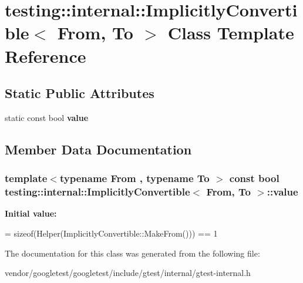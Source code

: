 \hypertarget{classtesting_1_1internal_1_1ImplicitlyConvertible}{}\section{testing\+:\+:internal\+:\+:Implicitly\+Convertible$<$ From, To $>$ Class Template Reference}
\label{classtesting_1_1internal_1_1ImplicitlyConvertible}
\subsection*{Static Public Attributes}
\begin{DoxyCompactItemize}
\item 
static const bool {\bfseries value}
\end{DoxyCompactItemize}


\subsection{Member Data Documentation}
\subsubsection[{\texorpdfstring{value}{value}}]{\setlength{\rightskip}{0pt plus 5cm}template$<$typename From , typename To $>$ const bool {\bf testing\+::internal\+::\+Implicitly\+Convertible}$<$ From, To $>$\+::value\hspace{0.3cm}{\ttfamily [static]}}\hypertarget{classtesting_1_1internal_1_1ImplicitlyConvertible_aea51cecabca681fb75659e224771b7b7}{}\label{classtesting_1_1internal_1_1ImplicitlyConvertible_aea51cecabca681fb75659e224771b7b7}
{\bfseries Initial value\+:}
\begin{DoxyCode}
=
      \textcolor{keyword}{sizeof}(Helper(ImplicitlyConvertible::MakeFrom())) == 1
\end{DoxyCode}


The documentation for this class was generated from the following file\+:\begin{DoxyCompactItemize}
\item 
vendor/googletest/googletest/include/gtest/internal/gtest-\/internal.\+h\end{DoxyCompactItemize}
